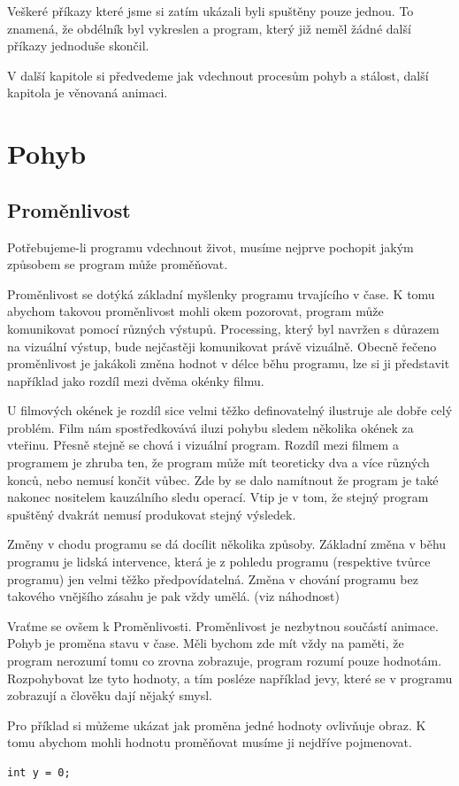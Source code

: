 \documentclass[10pt]{book}
\newcommand{\oddil}[1]{\section{#1}\index{#1}\label{#1}}
\newcommand{\pododdil}[1]{\subsection{#1}\index{#1}\label{#1}}
\begin{document}
Veškeré příkazy které jsme si zatím ukázali byli spuštěny pouze jednou. To znamená, že obdélník byl vykreslen a program, který již neměl žádné další příkazy jednoduše skončil.

V další kapitole si předvedeme jak vdechnout procesům pohyb a stálost, další kapitola je věnovaná animaci.



\oddil{Pohyb}

\pododdil{Proměnlivost}


Potřebujeme-li programu vdechnout život, musíme nejprve pochopit jakým způsobem se program může proměňovat.

Proměnlivost se dotýká základní myšlenky programu trvajícího v čase. K tomu abychom takovou proměnlivost mohli okem pozorovat, program může komunikovat pomocí různých výstupů. Processing, který byl navržen s důrazem na vizuální výstup, bude nejčastěji komunikovat právě vizuálně. Obecně řečeno proměnlivost je jakákoli změna hodnot v délce běhu programu, lze si ji představit například jako rozdíl mezi dvěma okénky filmu.

U filmových okének je rozdíl sice velmi těžko definovatelný ilustruje ale dobře celý problém. Film nám spostředkovává iluzi pohybu sledem několika okének za vteřinu. Přesně stejně se chová i vizuální program. Rozdíl mezi filmem a programem je zhruba ten, že program může mít teoreticky dva a více různých konců, nebo nemusí končit vůbec. Zde by se dalo namítnout že program je také nakonec nositelem kauzálního sledu operací. Vtip je v tom, že stejný program spuštěný dvakrát nemusí produkovat stejný výsledek.

Změny v chodu programu se dá docílit několika způsoby. Základní změna v běhu programu je lidská intervence, která je z pohledu programu (respektive tvůrce programu) jen velmi těžko předpovídatelná. Změna v chování programu bez takového vnějšího zásahu je pak vždy umělá. (viz náhodnost)


Vraťme se ovšem k Proměnlivosti. Proměnlivost je nezbytnou součástí animace. Pohyb je proměna stavu v čase. Měli bychom zde mít vždy na paměti, že program nerozumí tomu co zrovna zobrazuje, program rozumí pouze hodnotám. Rozpohybovat lze tyto hodnoty, a tím posléze například jevy, které se v programu zobrazují a člověku dají nějaký smysl. 

Pro příklad si můžeme ukázat jak proměna jedné hodnoty ovlivňuje obraz. K tomu abychom mohli hodnotu proměňovat musíme ji nejdříve pojmenovat.

\begin{lstlisting}
int y = 0;
\end{lstlisting}
\end{document}
